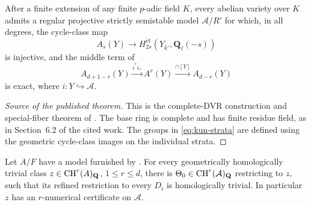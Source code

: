 \begin{theorem}
\label{thm:kunnemann-local}
After a finite extension of any finite $p$-adic field $K$, every
abelian variety over $K$ admits a regular projective strictly
semistable model $\mathcal A/R'$ for which, in all degrees, the
cycle-class map
\[
 A_s(Y)\longrightarrow
 H^{\mathrm{\acute et}}_{2s}(Y_{\bar k'},\mathbf Q_\ell(-s))
\]
is injective, and the middle term of
\begin{equation}\label{eq:kun-complex}
 A_{d+1-r}(Y)\xrightarrow{i^*i_*} A^r(Y)
                   \xrightarrow{\cap[Y]} A_{d-r}(Y)
\end{equation}
is exact, where $i:Y\hookrightarrow\mathcal A$.
\end{theorem}

\begin{proof}[Source of the published theorem]
This is the complete-DVR construction and special-fiber theorem
of \cite[Theorems~5.6 and~6.6]{Kunnemann}.
The base ring is complete and has finite residue field, as in
Section~6.2 of the cited work.  The groups in
\eqref{eq:kun-strata} are defined using the geometric
cycle-class images on the individual strata.
\end{proof}

\begin{lemma}
\label{lem:abelian-lift}
Let $A/F$ have a model furnished by
.  For every geometrically homologically
trivial class $z\in\operatorname{CH}^r(A)_{\mathbf Q}$,
$1\le r\le d$, there is $\Theta_0\in\operatorname{CH}^r(\mathcal A)_{\mathbf Q}$
restricting to $z$, such that its refined restriction to
every $D_i$ is homologically trivial.  In particular $z$ has
an $r$-numerical certificate on $\mathcal A$.
\end{lemma}

